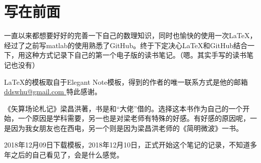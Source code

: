 \documentclass[cyan]{elegantnote}
\author{陈传升}
\begin{document}
	\maketitle
	\tableofcontents
	\chapter{写在前面}
	一直以来都想要好好的完善一下自己的数理知识，同时也愉快的使用一次\LaTeX，经过了之前写matlab的使用熟悉了GitHub。终于下定决心\LaTeX 和GitHub结合一下，用这种方式记录下自己的第一个电子版的读书笔记。（嗯。其实手写的读书笔记也没有）
	
	\LaTeX 的模板取自于Elegant Note模板，得到的作者的唯一联系方式是他的邮箱 \url{ddswhu@gmail.com }特此感谢。
	
	《矢算场论札记》梁昌洪著，书是和“大佬”借的。选择这本书作为自己的一个开始，一个原因是学科需要，另一也是对梁老师有特殊的好感。有好感的原因呢，一是因为我女朋友也在西电，另一个则是因为梁昌洪老师的《简明微波》一书。
	
	2018年12月09日下载模板，2018年12月10日，正式开始这个笔记的记录，不知道多年之后的自己看见了，会是什么感觉。
	
	
	
	
	
	
\end{document}
